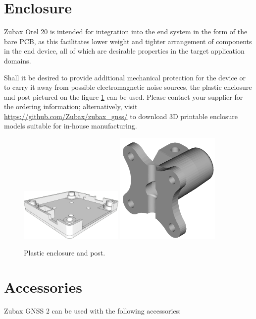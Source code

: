 \documentclass{zubaxdoc}
\begin{document}
\section{Enclosure}\label{sec:enclosure}

Zubax Orel 20 is intended for integration into the end system in the form of the bare PCB,
as this facilitates lower weight and tighter arrangement of components
in the end device, all of which are desirable properties in the target application domains.

Shall it be desired to provide additional mechanical protection for the device or to carry it away from possible electromagnetic noise sources, the plastic enclosure and post pictured on the figure \ref{enclosure} can be used.
Please contact your supplier for the ordering information;
alternatively, visit \url{https://github.com/Zubax/zubax_gnss/} to download
3D printable enclosure models suitable for in-house manufacturing.

\begin{figure}[hb]
	\centering
	\includegraphics[width=0.45\textwidth]{housing}
	\includegraphics[width=0.45\textwidth]{post}
	\caption{Plastic enclosure and post.\label{enclosure}}
\end{figure}

\section{Accessories}

Zubax GNSS 2 can be used with the following accessories:
\end{document}
